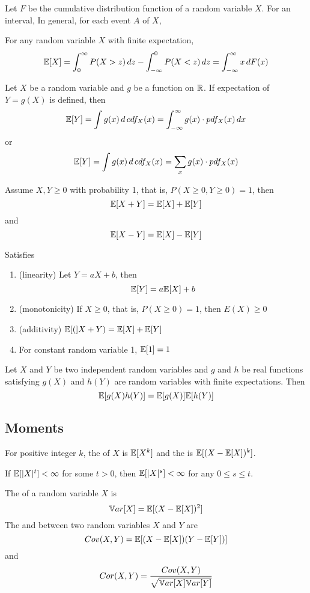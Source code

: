 \documentclass[11pt]{article}
\begin{document}
\lemma
Let $F$ be the cumulative distribution function of a random variable $X$. For an interval,  In general, for each event $A$ of $X$,

\theorem
For any random variable $X$ with finite expectation,
$$\mathbb{E}[{X}] = \int_0^\infty P(X > z)\,dz - \int_{-\infty}^0 P(X < z) \, dz = \int_{-\infty}^\infty x \, dF(x)$$

\theorem
Let $X$ be a random variable and $g$ be a function on $\mathbb{R}$. If expectation of $Y = g(X)$ is defined, then
$$\mathbb{E}[{Y}] = \int g(x)\, d\, cdf_X(x) = \int_{-\infty}^\infty g(x) \cdot pdf_X(x) \, dx$$ or 
$$\mathbb{E}[{Y}] = \int g(x)\, d\, cdf_X(x) = \sum_x g(x) \cdot pdf_X(x)$$

\lemma
Assume $X, Y \geq 0$ with probability 1, that is, $P(X \geq 0, Y \geq 0) = 1$, then
$$\mathbb{E}[{X + Y}] = \mathbb{E}[{X}] + \mathbb{E}[{Y}]$$
and
$$\mathbb{E}[{X - Y}] = \mathbb{E}[{X}] - \mathbb{E}[{Y}]$$

Satisfies\\
\begin{enumerate}
	\item (linearity) Let $Y = aX + b$, then $$\mathbb{E}[{Y}] = a\mathbb{E}[{X}] + b$$
	\item (monotonicity) If $X \geq 0$, that is, $P(X \geq 0) = 1$, then $E(X) \geq 0$
	\item (additivity) $\mathbb{E}[{(}]X + Y) = \mathbb{E}[{X}] + \mathbb{E}[{Y}]$
	\item For constant random variable 1, $\mathbb{E}[{1}] = 1$
\end{enumerate}

\theorem
Let $X$ and $Y$ be two independent random variables and $g$ and $h$ be real functions satisfying $g(X)$ and $h(Y)$ are random variables with finite expectations. Then
$$\mathbb{E}[{g(X)h(Y)}] = \mathbb{E}[{g(X)}]\mathbb{E}[{h(Y)}]$$

\subsection{Moments}
For positive integer $k$, the  of $X$ is $\mathbb{E}[{X^k}]$ and the  is $\mathbb{E}[{(X - \mathbb{E}[{X}])^k}]$.

\theorem
If $\mathbb{E}[{|X|^t}] < \infty$ for some $t > 0$, then $\mathbb{E}[{|X|^s}] < \infty$ for any $0 \leq s \leq t$.

The  of a random variable $X$ is
$$\mathbb{V}ar[{X}] = \mathbb{E}[{(X - \mathbb{E}[{X}])^2}]$$
The  and  between two random variables $X$ and $Y$ are
$$Cov(X,Y) = \mathbb{E}[{(X - \mathbb{E}[{X}])(Y - \mathbb{E}[{Y}])}]$$ and
$$Cor(X,Y) = \frac{Cov(X, Y)}{\sqrt{\mathbb{V}ar[{X}]\mathbb{V}ar[{Y}]}}$$
\end{document}
